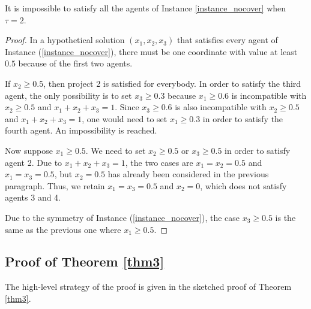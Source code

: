 \documentclass{article}
\begin{document}
\begin{observation} \label{imposs}
It is impossible to satisfy all the agents of 
Instance \ref{instance_nocover} 
when $\tau=2$.
\end{observation}
\begin{proof}

In a hypothetical solution $(x_1,x_2,x_3)$ that satisfies every agent of Instance (\ref{instance_nocover}), there must be one coordinate with value at least $0.5$ because of the first two agents. 

If $x_2 \ge 0.5$, then project 2 is satisfied for everybody. In order to satisfy the third agent, the only possibility is to set $x_3 \ge 0.3$ because $x_1 \ge 0.6$ is incompatible with $x_2 \ge 0.5$ and $x_1+x_2+x_3=1$. Since $x_3 \ge 0.6$ is also incompatible with $x_2 \ge 0.5$ and $x_1+x_2+x_3=1$, one would need to set $x_1 \ge 0.3$ in order to satisfy the fourth agent. An impossibility is reached. 

Now suppose $x_1 \ge 0.5$. We need to set $x_2 \ge 0.5$ or $x_3 \ge 0.5$ in order to satisfy agent 2. Due to $x_1+x_2+x_3=1$, the two cases are $x_1 =x_2= 0.5$ and $x_1=x_3= 0.5$, but $x_2=0.5$ has already been considered in the previous paragraph. Thus, we retain $x_1=x_3= 0.5$ and $x_2=0$, which does not satisfy agents 3 and 4.           

Due to the symmetry of Instance (\ref{instance_nocover}), the case $x_3 \ge 0.5$ is the same as the previous one where $x_1 \ge 0.5$. \end{proof}







\subsection{Proof of Theorem \ref{thm3}}
\label{sec:proof:lem:pair}
The high-level strategy of the proof is given in the sketched proof of Theorem \ref{thm3}.
\end{document}
